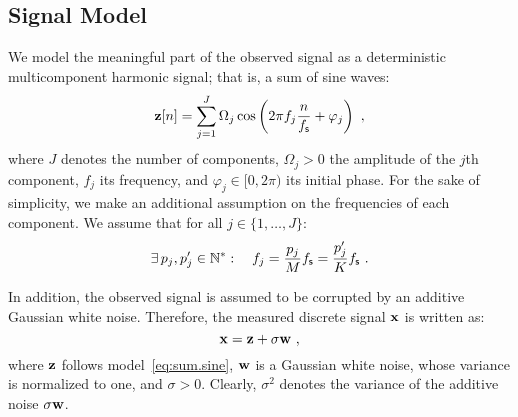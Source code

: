 \subsection{Signal Model}
\label{sse:model.sine}
We model the meaningful part of the observed signal as a deterministic multicomponent harmonic signal; that is, a sum of sine waves:
\begin{equation}
\bz[n]=\sum_{j=1}^J\Omega_j\cos\left(2\pi f_j \frac{n}{\fs} + \varphi_j\right)\ ,
\label{eq:sum.sine}
\end{equation}
where $J$ denotes the number of components, $\Omega_j>0$ the amplitude of the $j$th component, $f_j$ its frequency, and $\varphi_j\in[0,2\pi)$ its initial phase.
%
For the sake of simplicity, we make an additional assumption on the frequencies of each component. We assume that for all $j\in\{1,\dots,J\}$:
\begin{equation}
\exists\, p_j,p_j'\in\mathbb N^*: \quad f_j = \dfrac{p_j}{M}f_{\mathsf s} = \dfrac{p'_j}{K}f_{\mathsf s}\ .
\end{equation}


In addition, the observed signal is assumed to be corrupted by an additive Gaussian white noise. Therefore, the measured discrete signal ${\mathbf x}$ is written as:
\begin{equation}
\bx = \bz + \sigma\bw\ ,
\label{eq:model.noise}
\end{equation}
where ${\mathbf z}$ follows model~\eqref{eq:sum.sine}, ${\mathbf w}$ is a Gaussian white noise, whose variance is normalized to one, and $\sigma>0$. Clearly, $\sigma^2$ denotes the variance of the additive noise $\sigma{\mathbf w}$.


